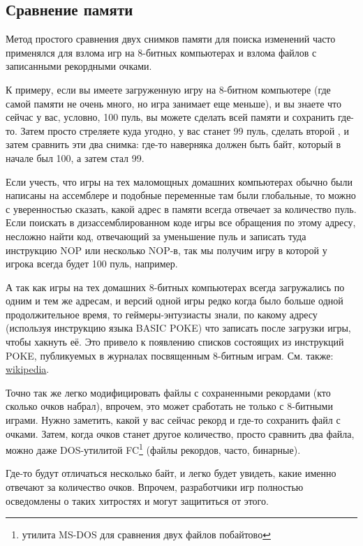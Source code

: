 \subsection{Сравнение  памяти}
\label{snapshots_comparing}

Метод простого сравнения двух снимков памяти для поиска изменений часто применялся для взлома игр 
на 8-битных компьютерах и взлома файлов с записанными рекордными очками.

К примеру, если вы имеете загруженную игру на 8-битном компьютере (где самой памяти не очень много, но игра
занимает еще меньше), и вы знаете что сейчас у вас, условно, 100 пуль, вы можете сделать  всей
памяти и сохранить где-то. Затем просто стреляете куда угодно, у вас станет 99 пуль, сделать второй ,
и затем сравнить эти два снимка: где-то наверняка должен быть байт, который в начале был 100, а затем стал 99.

Если учесть, что игры на тех маломощных домашних компьютерах обычно были написаны на ассемблере и подобные
переменные там были глобальные, то можно с уверенностью сказать, какой адрес в памяти всегда отвечает за количество
пуль. Если поискать в дизассемблированном коде игры все обращения по этому адресу, несложно найти код,
отвечающий за уменьшение пуль и записать туда инструкцию \gls{NOP}
или несколько \gls{NOP}-в, так мы получим игру в которой у игрока всегда будет 100 пуль, например.

А так как игры на тех домашних 8-битных 
компьютерах всегда загружались по одним и тем же адресам, и версий одной игры редко когда было больше одной продолжительное время,
то геймеры-энтузиасты знали, по какому адресу (используя инструкцию языка BASIC \gls{POKE}) что записать после загрузки
игры, чтобы хакнуть её. Это привело к появлению списков  состоящих из инструкций \gls{POKE}, публикуемых
в журналах посвященным 8-битным играм. См. также: \href{http://go.yurichev.com/17114}{wikipedia}.

Точно так же легко модифицировать файлы с сохраненными рекордами (кто сколько очков набрал), впрочем, это может
сработать не только с 8-битными играми. Нужно заметить, какой у вас сейчас рекорд и где-то сохранить файл
с очками. Затем, когда очков станет другое количество, просто сравнить два файла, можно даже
DOS-утилитой FC\footnote{утилита MS-DOS для сравнения двух файлов побайтово} (файлы рекордов, часто, бинарные).

Где-то будут отличаться несколько байт, и легко будет увидеть, какие именно отвечают за количество очков. 
Впрочем, разработчики игр полностью осведомлены о таких хитростях и могут защититься от этого.

